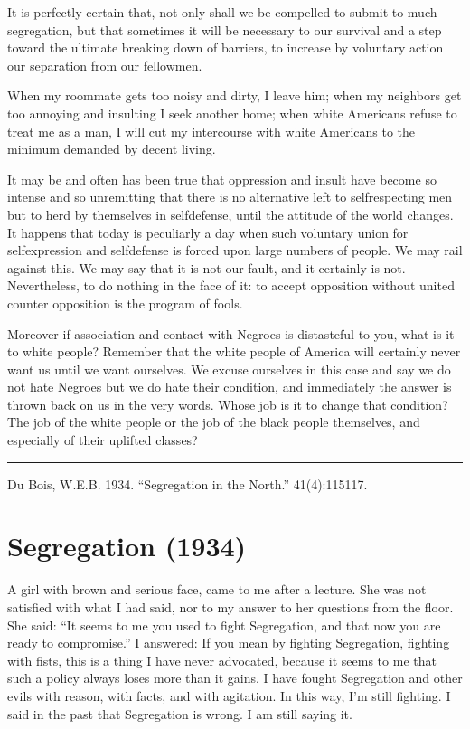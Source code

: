 \documentclass[letterpaper,10pt,english]{jupyterBook}
\begin{document}
\sphinxAtStartPar
It is perfectly certain that, not only shall we be compelled to submit to much segregation, but that sometimes it will be necessary to our survival and a step toward the ultimate breaking down of barriers, to increase by voluntary action our separation from our fellowmen.

\sphinxAtStartPar
When my room\sphinxhyphen{}mate gets too noisy and dirty, I leave him; when my neighbors get too annoying and insulting I seek another home; when white Americans refuse to treat me as a man, I will cut my intercourse with white Americans to the minimum demanded by decent living.

\sphinxAtStartPar
It may be and often has been true that oppression and insult have become so intense and so unremitting that there is no alternative left to self\sphinxhyphen{}respecting men but to herd by themselves in self\sphinxhyphen{}defense, until the attitude of the world changes. It happens that today is peculiarly a day when such voluntary union for self\sphinxhyphen{}expression and self\sphinxhyphen{}defense is forced upon large numbers of people. We may rail against this. We may say that it is not our fault, and it certainly is not. Nevertheless, to do nothing in the face of it: to accept opposition without united counter opposition is the program of fools.

\sphinxAtStartPar
Moreover if association and contact with Negroes is distasteful to you, what is it to white people? Remember that the white people of America will certainly never want us until we want ourselves. We excuse ourselves in this case and say we do not hate Negroes but we do hate their condition, and immediately the answer is thrown back on us in the very words. Whose job is it to change that condition? The job of the white people or the job of the black people themselves, and especially of their uplifted classes?


\bigskip\hrule\bigskip


\sphinxAtStartPar
{} Du Bois, W.E.B. 1934. “Segregation in the North.”  41(4):115\sphinxhyphen{}117.


\section{Segregation (1934)}
\label{\detokenize{Volumes/41/05/segregation:segregation-1934}}\label{\detokenize{Volumes/41/05/segregation::doc}}
\sphinxAtStartPar
A girl with brown and serious face, came to me after a lecture. She was not satisfied with what I had said, nor to my answer to her questions from the floor. She said: “It seems to me you used to fight Segregation, and that now you are ready to compromise.” I answered: If you mean by fighting Segregation, fighting with fists, this is a thing I have never advocated, because it seems to me that such a policy always loses more than it gains. I have fought Segregation and other evils with reason, with facts, and with agitation. In this way, I’m still fighting. I said in the past that Segregation is wrong. I am still saying it.
\end{document}
